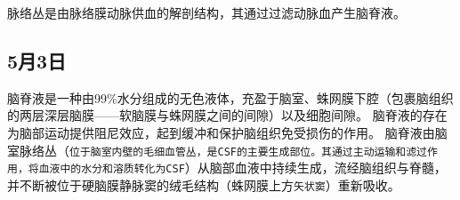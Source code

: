 \documentclass[12pt,a4paper]{article}
\begin{document}
脉络丛是由脉络膜动脉供血的解剖结构，其通过过滤动脉血产生脑脊液。

\subsection*{5月3日}
脑脊液是一种由99\%水分组成的无色液体，充盈于脑室、蛛网膜下腔（包裹脑组织的两层深层脑膜——软脑膜与蛛网膜之间的间隙）以及细胞间隙。
脑脊液的存在为脑部运动提供阻尼效应，起到缓冲和保护脑组织免受损伤的作用。
脑脊液由脑室脉络丛（\texttt{位于脑室内壁的毛细血管丛，是CSF的主要生成部位。其通过主动运输和滤过作用，将血液中的水分和溶质转化为CSF}）从脑部血液中持续生成，流经脑组织与脊髓，并不断被位于硬脑膜静脉窦的绒毛结构（蛛网膜上方\texttt{矢状窦}）重新吸收\cite{evansDynamicsBifurcationsLowdimensional2016}。






\printbibliography
\end{document}

